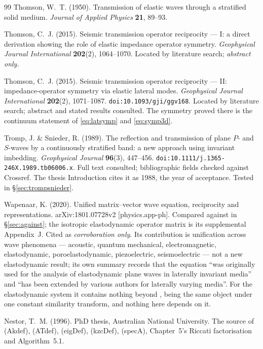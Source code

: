 \documentclass[11pt,a4paper]{article}
\begin{document}
\begin{thebibliography}{99}
 Thomson, W.~T. (1950).  Transmission of elastic waves
  through a stratified solid medium.  \emph{Journal of Applied Physics}
  \textbf{21}, 89--93.

 Thomson, C.~J. (2015).  Seismic transmission operator
  reciprocity --- I: a direct derivation showing the role of elastic impedance
  operator symmetry.  \emph{Geophysical Journal International} \textbf{202}(2),
  1064--1070.  Located by literature search; \emph{abstract only.}

 Thomson, C.~J. (2015).  Seismic transmission operator
  reciprocity --- II: impedance-operator symmetry via elastic lateral modes.
  \emph{Geophysical Journal International} \textbf{202}(2), 1071--1087.
  \texttt{doi:10.1093/gji/ggv168}.  Located by literature search; abstract and
  stated results consulted.  The symmetry proved there is the continuum
  statement of \eqref{eq:latsymp} and \eqref{eq:symp3d}.

 Tromp, J. \& Snieder, R. (1989).  The reflection and
  transmission of plane $P$- and $S$-waves by a continuously stratified band: a
  new approach using invariant imbedding.  \emph{Geophysical Journal}
  \textbf{96}(3), 447--456.  \texttt{doi:10.1111/j.1365-246X.1989.tb06006.x}.
  Full text consulted; bibliographic fields checked against Crossref.  The
  thesis Introduction cites it as 1988, the year of acceptance.  Tested in
  \S\ref{sec:trompsnieder}.

 Wapenaar, K. (2020).  Unified matrix--vector wave equation,
  reciprocity and representations.  arXiv:1801.07728v2 [physics.app-ph].
  Compared against in \S\ref{sec:against}; the isotropic elastodynamic operator
  matrix is its supplemental Appendix~J.  Cited as \emph{corroboration only}.
  Its contribution is unification across wave phenomena --- acoustic, quantum
  mechanical, electromagnetic, elastodynamic, poroelastodynamic, piezoelectric,
  seismoelectric --- not a new elastodynamic result; its own summary records
  that the equation ``was originally used for the analysis of elastodynamic
  plane waves in laterally invariant media'' and ``has been extended by various
  authors for laterally varying media''.  For the elastodynamic system it
  contains nothing beyond \cite{nestor1996}, being the same object under one
  constant similarity transform, and nothing here depends on it.

 Nestor, T.~M. (1996).  PhD thesis, Australian National
  University.  The source of (Akdef), (ATdef), (eigDef), (kzcDef), (specA),
  Chapter~5's Riccati factorisation and Algorithm~5.1.

\end{thebibliography}
\endgroup
\end{document}
